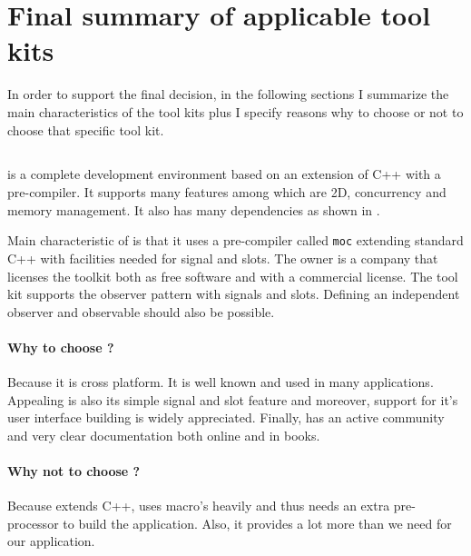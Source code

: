 \section{Final summary of applicable tool kits}
\label{sec:final-listing}

In order to support the final decision, in the following sections I summarize
the main characteristics of the tool kits plus I specify reasons why to choose
or not to choose that specific tool kit.

\subsection{} 

 is a complete development environment based on an extension of C++ with
a  pre-compiler. It supports many features among which are 2D,
concurrency and memory management. It also has many dependencies as shown in
\cite{qt:qt-dep}.

Main characteristic of  is that it uses a pre-compiler called
\texttt{moc} extending standard C++ with facilities needed for signal and
slots. The owner is a company  that licenses the  toolkit both
as free software and with a commercial license. The tool kit  supports
the observer pattern with signals and slots. Defining an independent observer
and observable should also be possible.

\paragraph{Why to choose ?} Because it is cross platform. It is well
known and used in many applications. Appealing is also its simple signal and
slot feature and moreover, support for it's user interface building is 
widely appreciated.  Finally,  has an active community and very clear
documentation both online and in books. 

\paragraph{Why not to choose ?} Because  extends C++, uses macro's
heavily and thus needs an extra pre-processor to build the application. Also,
it provides a lot more than we need for our application. 

\subsection{}

